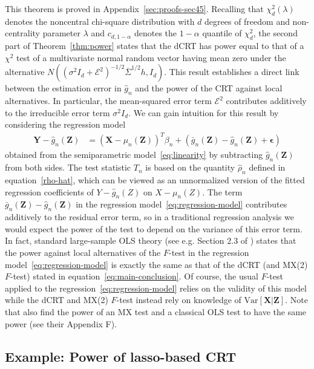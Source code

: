 \documentclass[ejs]{imsart}
\numberwithin{equation}{section}
\theoremstyle{plain}
\theoremstyle{definition}
\theoremstyle{remark}
\newcommand{\eps}{\epsilon}
\newcommand{\prx}{\bm X}
\newcommand{\srx}{X}
\newcommand{\prz}{\bm Z}
\newcommand{\srz}{Z}
\newcommand{\pry}{{\bm Y}}
\newcommand{\sry}{Y}
\begin{document}
This theorem is proved in Appendix~\ref{sec:proofs-sec45}. Recalling that $\chi^2_d(\lambda)$ denotes the noncentral chi-square distribution with $d$ degrees of freedom and non-centrality parameter $\lambda$ and $c_{d,1-\alpha}$ denotes the $1-\alpha$ quantile of $\chi^2_d$, the second part of Theorem~\ref{thm:power} states that the dCRT has power equal to that of a $\chi^2$ test of a multivariate normal random vector having mean zero under the alternative $N((\sigma^2I_d +\mathcal E^2)^{-1/2}\overline \Sigma^{1/2} h, I_d)$. This result establishes a direct link between the estimation error in $\widehat g_n$ and the power of the CRT against local alternatives. In particular, the mean-squared error term $\mathcal E^2$ contributes additively to the irreducible error term $\sigma^2 I_d$. We can gain intuition for this result by considering the regression model
\begin{equation}
\begin{split}
\pry - \widehat g_n(\prz) &= (\prx - \mu_n(\prz))^T\beta_n + (\bar g_n(\prz) - \widehat g_n(\prz) + \bm \eps)
\label{eq:regression-model}
\end{split}
\end{equation}
obtained from the semiparametric model~\eqref{eq:linearity} by subtracting $\widehat g_n(\prz)$ from both sides. The test statistic $T_n$ is based on the quantity $\widehat \rho_n$ defined in equation~\eqref{rho-hat}, which can be viewed as an unnormalized version of the fitted regression coefficients of $\sry - \widehat g_n(\srz)$ on $\srx - \mu_n(\srz)$. The term $\bar g_n(\prz) - \widehat g_n(\prz)$ in the regression model~\eqref{eq:regression-model} contributes additively to the residual error term, so in a traditional regression analysis we would expect the power of the test to depend on the variance of this error term. In fact, standard large-sample OLS theory (see e.g. Section 2.3 of \cite{Hayashi2000}) states that the power against local alternatives of the $F$-test in the regression model~\eqref{eq:regression-model} is exactly the same as that of the dCRT (and MX(2) $F$-test) stated in equation~\eqref{eq:main-conclusion}. Of course, the usual $F$-test applied to the regression~\eqref{eq:regression-model} relies on the validity of this model while the dCRT and MX(2) $F$-test instead rely on knowledge of $\text{Var}[\prx|\prz]$. Note that \cite{Wang2020b} also find the power of an MX test and a classical OLS test to have the same power (see their Appendix F).

\subsection{Example: Power of lasso-based CRT} \label{sec:power-lasso-based}
\end{document}
